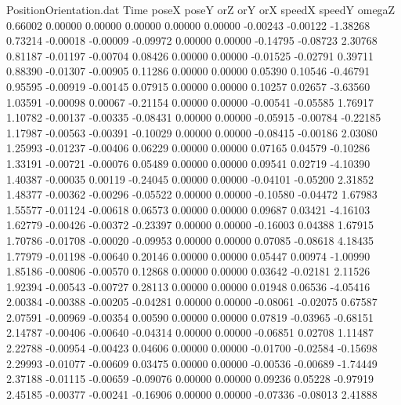 \begin{filecontents}{PositionOrientation.dat}
Time poseX poseY orZ orY orX speedX speedY omegaZ
   0.66002    0.00000    0.00000     0.00000    0.00000    0.00000   -0.00243   -0.00122   -1.38268
   0.73214   -0.00018   -0.00009    -0.09972    0.00000    0.00000   -0.14795   -0.08723    2.30768
   0.81187   -0.01197   -0.00704     0.08426    0.00000    0.00000   -0.01525   -0.02791    0.39711
   0.88390   -0.01307   -0.00905     0.11286    0.00000    0.00000    0.05390    0.10546   -0.46791
   0.95595   -0.00919   -0.00145     0.07915    0.00000    0.00000    0.10257    0.02657   -3.63560
   1.03591   -0.00098    0.00067    -0.21154    0.00000    0.00000   -0.00541   -0.05585    1.76917
   1.10782   -0.00137   -0.00335    -0.08431    0.00000    0.00000   -0.05915   -0.00784   -0.22185
   1.17987   -0.00563   -0.00391    -0.10029    0.00000    0.00000   -0.08415   -0.00186    2.03080
   1.25993   -0.01237   -0.00406     0.06229    0.00000    0.00000    0.07165    0.04579   -0.10286
   1.33191   -0.00721   -0.00076     0.05489    0.00000    0.00000    0.09541    0.02719   -4.10390
   1.40387   -0.00035    0.00119    -0.24045    0.00000    0.00000   -0.04101   -0.05200    2.31852
   1.48377   -0.00362   -0.00296    -0.05522    0.00000    0.00000   -0.10580   -0.04472    1.67983
   1.55577   -0.01124   -0.00618     0.06573    0.00000    0.00000    0.09687    0.03421   -4.16103
   1.62779   -0.00426   -0.00372    -0.23397    0.00000    0.00000   -0.16003    0.04388    1.67915
   1.70786   -0.01708   -0.00020    -0.09953    0.00000    0.00000    0.07085   -0.08618    4.18435
   1.77979   -0.01198   -0.00640     0.20146    0.00000    0.00000    0.05447    0.00974   -1.00990
   1.85186   -0.00806   -0.00570     0.12868    0.00000    0.00000    0.03642   -0.02181    2.11526
   1.92394   -0.00543   -0.00727     0.28113    0.00000    0.00000    0.01948    0.06536   -4.05416
   2.00384   -0.00388   -0.00205    -0.04281    0.00000    0.00000   -0.08061   -0.02075    0.67587
   2.07591   -0.00969   -0.00354     0.00590    0.00000    0.00000    0.07819   -0.03965   -0.68151
   2.14787   -0.00406   -0.00640    -0.04314    0.00000    0.00000   -0.06851    0.02708    1.11487
   2.22788   -0.00954   -0.00423     0.04606    0.00000    0.00000   -0.01700   -0.02584   -0.15698
   2.29993   -0.01077   -0.00609     0.03475    0.00000    0.00000   -0.00536   -0.00689   -1.74449
   2.37188   -0.01115   -0.00659    -0.09076    0.00000    0.00000    0.09236    0.05228   -0.97919
   2.45185   -0.00377   -0.00241    -0.16906    0.00000    0.00000   -0.07336   -0.08013    2.41888

\end{filecontents}
